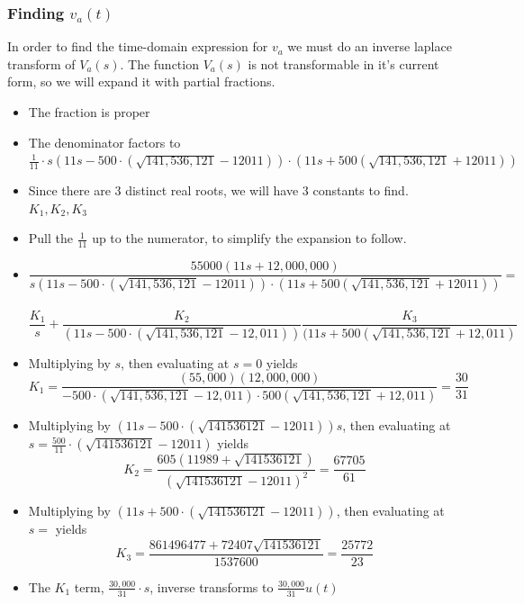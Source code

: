 \documentclass[11pt]{article}
\begin{document}
	\subsubsection*{Finding $v_a(t)$}
	In order to find the time-domain expression for $v_a$ we must do an inverse laplace transform of $V_a(s)$. The function $V_a(s)$ is not transformable in it's current form, so we will expand it with partial fractions.
	\begin{itemize}
		\item The fraction is proper
		\item The denominator factors to $\frac{1}{11}\cdot s(11s-500\cdot (\sqrt{141,536,121}-12011))\cdot (11s+500(\sqrt{141,536,121}+12011))$
		\item Since there are 3 distinct real roots, we will have 3 constants to find. $K_1,K_2,K_3$
		\item Pull the $\frac{1}{11}$ up to the numerator, to simplify the expansion to follow.
		\item \[ \frac{55000(11s+12,000,000)}{s(11s-500\cdot (\sqrt{141,536,121}-12011))\cdot (11s+500(\sqrt{141,536,121}+12011))} =\] \\ \[ \frac{K_1}{s} + \frac{K_2}{(11s-500\cdot (\sqrt{141,536,121}-12,011))} \frac{K_3}{(11s+500(\sqrt{141,536,121}+12,011)}\]
		\item Multiplying by $s$, then evaluating at $s=0$ yields \[K_1=\frac{(55,000)(12,000,000)}{-500\cdot (\sqrt{141,536,121}-12,011)\cdot 500(\sqrt{141,536,121}+12,011)} = \frac{30}{31}\]
		\item Multiplying by $(11s-500\cdot (\sqrt{141536121}-12011))s$, then evaluating at $s=\frac{500}{11}\cdot (\sqrt{141536121}-12011) $ yields \[K_2 = \frac{605(11989+\sqrt{141536121})}{(\sqrt{141536121}-12011)^{2}} = \frac{67705}{61} \]
		\item Multiplying by $(11s+500\cdot (\sqrt{141536121}-12011))$, then evaluating at $s= $ yields \[K_3 = \frac{861496477+72407 \sqrt{141536121}}{1537600} = \frac{25772}{23}\]
		
		
		\item The $K_1$ term, $\frac{30,000}{31}\cdot s$, inverse transforms to $\frac{30,000}{31}u(t)$
	\end{itemize}
	
\end{document}
